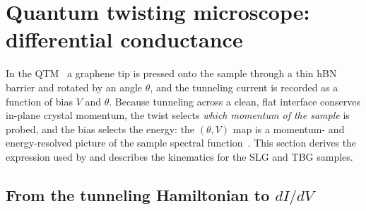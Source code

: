 \section{Quantum twisting microscope: differential conductance}
\label{sec:qtm}

In the QTM~\cite{Inbar2023} a graphene tip is pressed onto the sample through a thin hBN barrier and rotated by
an angle $\theta$, and the tunneling current is recorded as a function of bias $V$ and $\theta$. Because tunneling
across a clean, flat interface conserves in-plane crystal momentum, the twist selects \emph{which momentum of the
sample} is probed, and the bias selects the energy: the $(\theta,V)$ map is a momentum- and energy-resolved
picture of the sample spectral function~\cite{Wei2025b,Wei2025}. This section derives the expression used by
 and describes the kinematics for the SLG and TBG samples.

\subsection{From the tunneling Hamiltonian to $dI/dV$}

